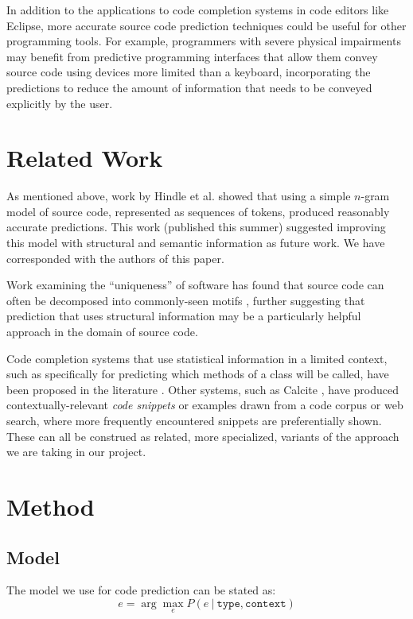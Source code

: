 \documentclass{article} %
\begin{document}
In addition to the applications to code completion systems in code editors like Eclipse, more accurate source code prediction techniques could be useful for other programming tools. For example, programmers with severe physical impairments may benefit from predictive programming interfaces that allow them convey source code using devices more limited than a keyboard, incorporating the predictions to reduce the amount of information that needs to be conveyed explicitly by the user.

\section*{Related Work}
As mentioned above, work by Hindle et al. \cite{Hindle:2012:NS:2337223.2337322} showed that using a simple $n$-gram model of source code, represented as sequences of tokens, produced reasonably accurate predictions. This work (published this summer) suggested improving this model with structural and semantic information as future work. We have corresponded with the authors of this paper.

Work examining the ``uniqueness'' of software has found that source code can often be decomposed into commonly-seen motifs \cite{Gabel:2010:FSE}, further suggesting that prediction that uses structural information may be a particularly helpful approach in the domain of source code.

Code completion systems that use statistical information in a limited context, such as specifically for predicting which methods of a class will be called, have been proposed in the literature \cite{Bruch:2009:LEI:1595696.1595728,robbes_how_2008}. Other systems, such as Calcite \cite{mooty_calcite:_2010}, have produced contextually-relevant {\em code snippets} or examples drawn from a code corpus or web search, where more frequently encountered snippets are preferentially shown. These can all be construed as related, more specialized, variants of the approach we are taking in our project.


\section*{Method}

\subsection*{Model}
The model we use for code prediction can be stated as:
$$ e = \arg\max_e P(e ~|~ \texttt{type} , \texttt{context} ) $$
\end{document}
